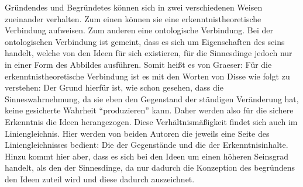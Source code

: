 Gründendes und Begründetes können sich in zwei verschiedenen Weisen zueinander verhalten. Zum einen können sie eine erkenntnistheoretische Verbindung aufweisen. Zum anderen eine ontologische Verbindung. Bei der ontologischen Verbindung ist gemeint, dass es sich um Eigenschaften des seins handelt, welche von den Ideen für sich existieren, für die Sinnesdinge jedoch nur in einer Form des Abbildes ausführen. Somit heißt es von Graeser:
Für die erkenntnistheoretische Verbindung ist es mit den Worten von Disse wie folgt zu verstehen:
Der Grund hierfür ist, wie schon gesehen, dass die Sinneswahrnehmung, da sie eben den Gegenstand der ständigen Veränderung hat, keine gesicherte Wahrheit \enquote{produzieren} kann. Daher werden also für die sichere Erkenntnis die Ideen herangezogen. 
Diese Verhältnismäßigkeit findet sich auch im Liniengleichnis. Hier werden von beiden Autoren die jeweils eine Seite des Liniengleichnisses bedient: Die der Gegenstände und die der Erkenntnisinhalte. Hinzu kommt hier aber, dass es sich bei den Ideen um einen höheren Seinsgrad handelt, als den der Sinnesdinge, da nur dadurch die Konzeption des begründens den Ideen zuteil wird und diese dadurch auszeichnet.
